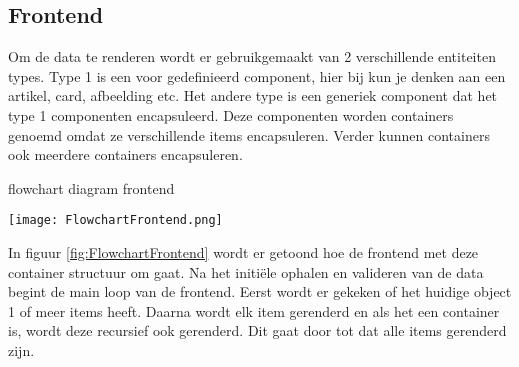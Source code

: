 \newpage
\subsection{Frontend}

Om de data te renderen wordt er gebruikgemaakt van 2 verschillende entiteiten types.
Type 1 is een voor gedefinieerd component, hier bij kun je denken aan een artikel, card, afbeelding etc.
Het andere type is een generiek component dat het type 1 componenten encapsuleerd.
Deze componenten worden containers genoemd omdat ze verschillende items encapsuleren.
Verder kunnen containers ook meerdere containers encapsuleren.

\whitespace
\begin{graphic}
    \captionsetup{type=figure}
    \caption{flowchart diagram frontend}
    \texttt{[image: FlowchartFrontend.png]}
    \label{fig:FlowchartFrontend}
\end{graphic}

\whitespace
In figuur \ref{fig:FlowchartFrontend} wordt er getoond hoe de frontend met deze container structuur om gaat.
Na het initiële ophalen en valideren van de data begint de main loop van de frontend.
Eerst wordt er gekeken of het huidige object 1 of meer items heeft.
Daarna wordt elk item gerenderd en als het een container is, wordt deze recursief ook gerenderd.
Dit gaat door tot dat alle items gerenderd zijn.

